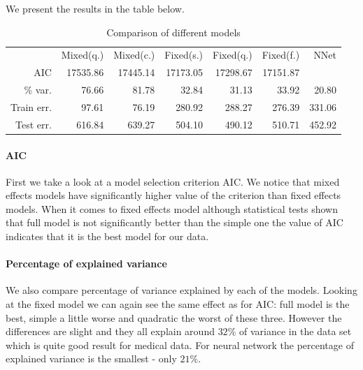 \documentclass[num-refs]{wiley-article}
\begin{document}
We present the results in the table below.

\begin{table}[H]
\caption{Comparison of different models}
\begin{threeparttable}
\centering
\begin{adjustbox}{max width=\textwidth}
\begin{tabular}{rrrrrrr}
 \headrow
 & Mixed(q.) & Mixed(c.) & Fixed(s.) & Fixed(q.) & Fixed(f.) & NNet \\ 

AIC & 17535.86 & 17445.14 & 17173.05 & 17298.67 & 17151.87 &  \\ 
  \% var. & 76.66 & 81.78 & 32.84 & 31.13 & 33.92 &  20.80\\ 
  Train err. & 97.61 & 76.19 & 280.92 & 288.27 & 276.39 & 331.06 \\ 
  Test err. & 616.84 & 639.27 & 504.10 & 490.12 & 510.71 & 452.92 \\ 
   \hline
\end{tabular}
\end{adjustbox}
\end{threeparttable}
\end{table}

\paragraph{AIC}

First we take a look at a model selection criterion AIC. We notice that mixed effects models have significantly higher value of the criterion than fixed effects models. When it comes to fixed effects model although statistical tests shown that full model is not significantly better than the simple one the value of AIC indicates that it is the best model for our data. 

\paragraph{Percentage of explained variance}

We also compare percentage of variance explained by each of the models. Looking at the fixed model we can again see the same effect as for AIC: full model is the best, simple a little worse and quadratic the worst of these three. However the differences are slight and they all explain around $32$\% of variance in the data set which is quite good result for medical data. For neural network the percentage of explained variance is the smallest - only $21\%$.
\end{document}
